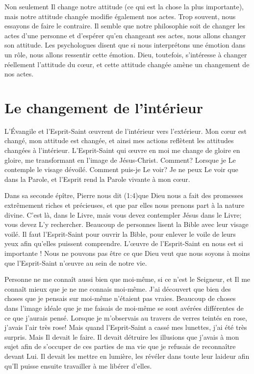 Non seulement Il change notre attitude (ce qui est la chose la plus importante),
 mais notre attitude changée modifie également nos actes.
 Trop souvent, nous essayons de faire le contraire.
 Il semble que notre philosophie soit de changer les actes d'une personne
 et d'espérer qu'en changeant ses actes, nous allons changer son attitude.
 Les psychologues disent que si nous interprétons une émotion dans un rôle, nous allons ressentir
 cette émotion.
 Dieu, toutefois, s'intéresse à changer réellement l'attitude du cœur,
 et cette attitude changée amène un changement de nos actes.


\section{Le changement de l'int\'erieur}

L'Évangile et l'Esprit-Saint œuvrent de l'intérieur vers l'exté\-rieur.
 Mon cœur est changé, mon attitude est changée,
 et ainsi mes actions reflètent les attitudes changées à l'intérieur.
 L'Esprit-Saint qui œuvre en moi me change de gloire en gloire,
 me transformant en l'image de Jésus-Christ. Comment?
 Lorsque je Le contemple le visage dévoilé.
 Comment puis-je Le voir? Je ne peux Le voir que dans la Parole,
 et l'Esprit rend la Parole vivante à mon cœur.

Dans sa seconde épître, Pierre nous dit
 (1:4)que Dieu nous a fait
 des promesses extrêmement riches et précieuses,
 et que par elles nous prenons part à la nature divine.
 C'est là, dans le Livre, mais vous devez contempler Jésus dans le Livre;
 vous devez L'y rechercher.
 Beaucoup de personnes lisent la Bible avec leur visage voilé.
 Il faut l'Esprit-Saint pour ouvrir la Bible, pour enlever le voile
 de leurs yeux afin qu'elles puissent comprendre.
 L'œuvre de l'Esprit-Saint en nous est si importante !
 Nous ne pouvons pas être ce que Dieu veut que nous soyons
 à moins que l'Esprit-Saint n'\oe{}uvre au sein de notre vie.

Personne ne me connaît aussi bien que moi-même, si ce n'est le Seigneur,
 et Il me connaît mieux que je ne me connais moi-même.
 J'ai découvert que bien des choses que je pensais
 sur moi-même n'étaient pas vraies.
 Beaucoup de choses dans l'image idéale que je me faisais de moi-même
 se sont avérées différentes de ce que j'aurais pensé.
 Lorsque je m'observais au travers de verres teintés en rose,
 j'avais l'air très rose!
 Mais quand l'Esprit-Saint a cassé mes lunettes,
 j'ai été très surpris. Mais Il devait le faire.
 Il devait détruire les illusions que j'avais à mon sujet afin de s'occuper
 de ces parties de ma vie que je refusais de reconnaître devant Lui.
 Il devait les mettre en lumière, les révéler dans toute leur laideur
 afin qu'Il puisse ensuite travailler à me libérer d'elles.


